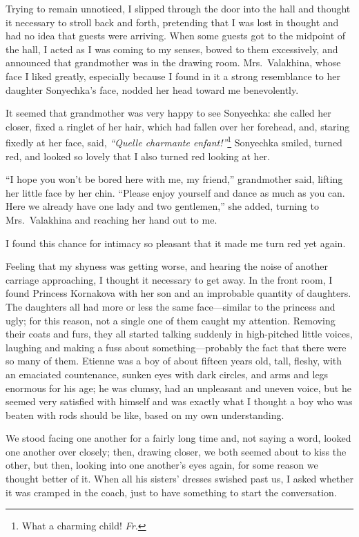 Trying to remain unnoticed, I slipped through the door into the hall and thought it necessary to stroll back and forth, pretending that I was lost in thought and had no idea that guests were arriving. When some guests got to the midpoint of the hall, I acted as I was coming to my senses, bowed to them excessively, and announced that grandmother was in the drawing room. Mrs.~Valakhina, whose face I liked greatly, especially because I found in it a strong resemblance to her daughter Sonyechka's face, nodded her head toward me benevolently.

It seemed that grandmother was very happy to see Sonyechka: she called her closer, fixed a ringlet of her hair, which had fallen over her forehead, and, staring fixedly at her face, said, \textit{``Quelle charmante enfant!''}\footnote{What a charming child! \textit{Fr.}} Sonyechka smiled, turned red, and looked so lovely that I also turned red looking at her.

``I hope you won't be bored here with me, my friend,'' grandmother said, lifting her little face by her chin. ``Please enjoy yourself and dance as much as you can. Here we already have one lady and two gentlemen,'' she added, turning to Mrs.~Valakhina and reaching her hand out to me.

I found this chance for intimacy so pleasant that it made me turn red yet again.

Feeling that my shyness was getting worse, and hearing the noise of another carriage approaching, I thought it necessary to get away. In the front room, I found Princess Kornakova with her son and an improbable quantity of daughters. The daughters all had more or less the same face---similar to the princess and ugly; for this reason, not a single one of them caught my attention. Removing their coats and furs, they all started talking suddenly in high-pitched little voices, laughing and making a fuss about something---probably the fact that there were so many of them. Etienne was a boy of about fifteen years old, tall, fleshy, with an emaciated countenance, sunken eyes with dark circles, and arms and legs enormous for his age; he was clumsy, had an unpleasant and uneven voice, but he seemed very satisfied with himself and was exactly what I thought a boy who was beaten with rods should be like, based on my own understanding.

We stood facing one another for a fairly long time and, not saying a word, looked one another over closely; then, drawing closer, we both seemed about to kiss the other, but then, looking into one another's eyes again, for some reason we thought better of it. When all his sisters' dresses swished past us, I asked whether it was cramped in the coach, just to have something to start the conversation.

